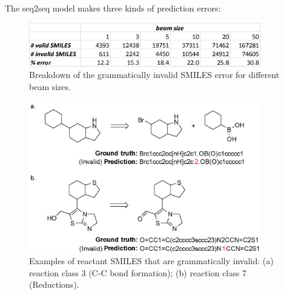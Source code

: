 The seq2seq model makes three kinds of prediction errors:

\begin{figure}
  \centering
  \includegraphics[width=0.9\textwidth]{Images/ret_table_4.png}
  \caption{Breakdown of the grammatically invalid SMILES error for different beam sizes.}
  \label{fig:ret_table4}
\end{figure}

\begin{figure}
  \centering
  \includegraphics[width=0.9\textwidth]{Images/ret_seq2seq_grammer_invalid.png}
  \caption{Examples of reactant SMILES that are grammatically invalid: (a) reaction class 3 (C-C bond formation); (b) reaction class 7 (Reductions).}
  \label{fig:ret_table2}
\end{figure}


